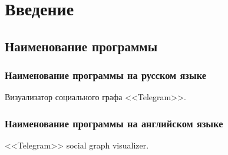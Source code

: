 \section{Введение}

\subsection{Наименование программы}

\subsubsection{Наименование программы на русском языке}

Визуализатор социального графа <<Telegram>>.

\subsubsection{Наименование программы на английском языке}

<<Telegram>> social graph visualizer.